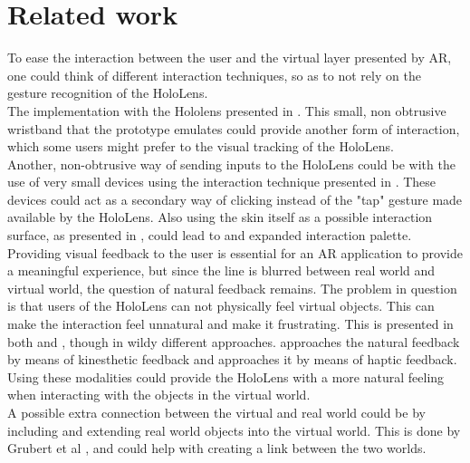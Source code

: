 
\section{Related work}
To ease the interaction between the user and the virtual layer presented by AR, one could think of different interaction techniques, so as to not rely on the gesture recognition of the HoloLens.\\
The implementation with the Hololens presented in \cite{watchsense}. This small, non obtrusive wristband that the prototype emulates could provide another form of interaction, which some users might prefer to the visual tracking of the HoloLens.\\
Another, non-obtrusive way of sending inputs to the HoloLens could be with the use of very small devices using the interaction technique presented in \cite{back}. These devices could act as a secondary way of clicking instead of the "tap" gesture made available by the HoloLens. Also using the skin itself as a possible interaction surface, as presented in \cite{skin}, could lead to and expanded interaction palette.\\
Providing visual feedback to the user is essential for an AR application to  provide a meaningful experience, but since the line is blurred between real world and virtual world, the question of natural feedback remains. The problem in question is that users of the HoloLens can not physically feel virtual objects. This can make the interaction feel unnatural and make it frustrating. This is presented in both \cite{stroem} and \cite{finger}, though in wildy different approaches. \cite{stroem} approaches the natural feedback by means of kinesthetic feedback and \cite{finger} approaches it by means of haptic feedback. Using these modalities could provide the HoloLens with a more natural feeling when interacting with the objects in the virtual world.\\
A possible extra connection between the virtual and real world could be by including and extending real world objects into the virtual world. This is done by Grubert et al \cite{multifi}, and could help with creating a link between the two worlds. 